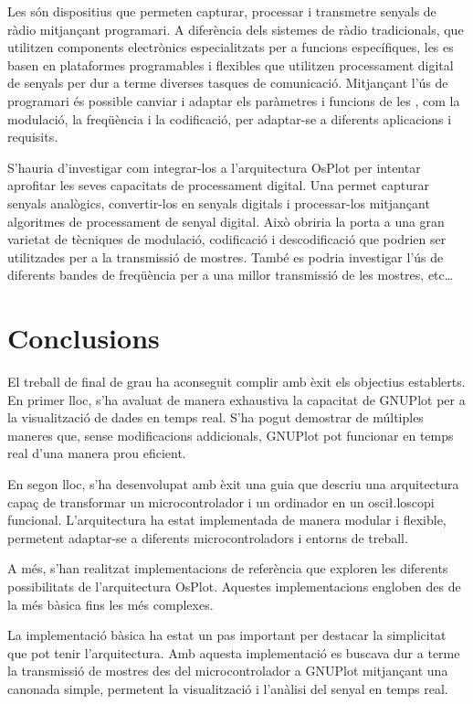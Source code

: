 \documentclass{tfgitic}[2023/07/07]
\begin{document}
Les  són dispositius que permeten capturar, processar i
transmetre senyals de ràdio mitjançant programari. A diferència dels
sistemes de ràdio tradicionals, que utilitzen components electrònics
especialitzats per a funcions específiques, les  es basen en
plataformes programables i flexibles que utilitzen processament
digital de senyals per dur a terme diverses tasques de comunicació.
Mitjançant l'ús de programari és possible canviar i adaptar els
paràmetres i funcions de les , com la modulació, la
freqüència i la codificació, per adaptar-se a diferents aplicacions i
requisits.

S'hauria d'investigar com integrar-los a l'arquitectura OsPlot per
intentar aprofitar les seves capacitats de processament digital. Una
 permet capturar senyals analògics, convertir-los en senyals
digitals i processar-los mitjançant algoritmes de processament de
senyal digital. Això obriria la porta a una gran varietat de tècniques
de modulació, codificació i descodificació que podrien ser utilitzades
per a la transmissió de mostres. També es podria investigar l'ús de
diferents bandes de freqüència per a una millor transmissió de les
mostres, etc\dots

\chapter{Conclusions}

El treball de final de grau ha aconseguit complir amb èxit els
objectius establerts. En primer lloc, s'ha avaluat de manera
exhaustiva la capacitat de GNUPlot per a la visualització de dades
en temps real. S'ha pogut demostrar de múltiples maneres que,
sense modificacions addicionals, GNUPlot pot funcionar en temps real
d'una manera prou eficient.

En segon lloc, s'ha desenvolupat amb èxit una guia que descriu una
arquitectura capaç de transformar un microcontrolador i un ordinador
en un osci\l.loscopi funcional. L'arquitectura ha estat implementada
de manera modular i flexible, permetent adaptar-se a diferents
microcontroladors i entorns de treball.

A més, s'han realitzat implementacions de referència que exploren les
diferents possibilitats de l'arquitectura OsPlot. Aquestes
implementacions engloben des de la més bàsica fins les més complexes.

La implementació bàsica ha estat un pas important per destacar la
simplicitat que pot tenir l'arquitectura. Amb aquesta implementació es
buscava dur a terme la transmissió de mostres des del microcontrolador
a GNUPlot mitjançant una canonada simple, permetent la visualització i
l'anàlisi del senyal en temps real.
\end{document}
